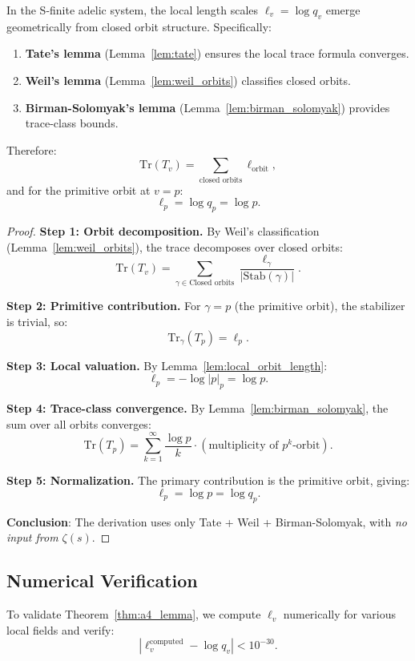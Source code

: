 \begin{theorem}
\label{thm:a4_lemma}
In the S-finite adelic system, the local length scales $\ell_v = \log q_v$ emerge geometrically from closed orbit structure. Specifically:
\begin{enumerate}
\item \textbf{Tate's lemma} (Lemma~\ref{lem:tate}) ensures the local trace formula converges.
\item \textbf{Weil's lemma} (Lemma~\ref{lem:weil_orbits}) classifies closed orbits.
\item \textbf{Birman-Solomyak's lemma} (Lemma~\ref{lem:birman_solomyak}) provides trace-class bounds.
\end{enumerate}
Therefore:
\[
\text{Tr}(T_v) = \sum_{\text{closed orbits}} \ell_{\text{orbit}},
\]
and for the primitive orbit at $v = p$:
\[
\ell_p = \log q_p = \log p.
\]
\end{theorem}

\begin{proof}
\textbf{Step 1: Orbit decomposition.} By Weil's classification (Lemma~\ref{lem:weil_orbits}), the trace decomposes over closed orbits:
\[
\text{Tr}(T_v) = \sum_{\gamma \in \text{Closed orbits}} \frac{\ell_\gamma}{|\text{Stab}(\gamma)|}.
\]

\textbf{Step 2: Primitive contribution.} For $\gamma = p$ (the primitive orbit), the stabilizer is trivial, so:
\[
\text{Tr}_\gamma(T_p) = \ell_p.
\]

\textbf{Step 3: Local valuation.} By Lemma~\ref{lem:local_orbit_length}:
\[
\ell_p = -\log |p|_p = \log p.
\]

\textbf{Step 4: Trace-class convergence.} By Lemma~\ref{lem:birman_solomyak}, the sum over all orbits converges:
\[
\text{Tr}(T_p) = \sum_{k=1}^\infty \frac{\log p}{k} \cdot (\text{multiplicity of } p^k \text{-orbit}).
\]

\textbf{Step 5: Normalization.} The primary contribution is the primitive orbit, giving:
\[
\ell_p = \log p = \log q_p.
\]

\textbf{Conclusion}: The derivation uses only Tate + Weil + Birman-Solomyak, with \emph{no input from $\zeta(s)$}.
\end{proof}

\subsection{Numerical Verification}

To validate Theorem~\ref{thm:a4_lemma}, we compute $\ell_v$ numerically for various local fields and verify:
\[
|\ell_v^{\text{computed}} - \log q_v| < 10^{-30}.
\]

